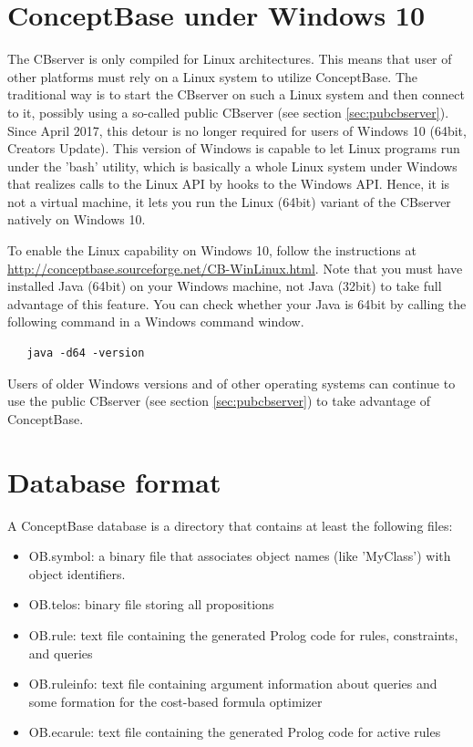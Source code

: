 \section{ConceptBase under Windows 10}
\label{sec:win10}
The CBserver is only compiled for Linux architectures. This means that user of
other platforms must rely on a Linux system to utilize ConceptBase. The traditional
way is to start the CBserver on such a Linux system and then connect to it, possibly
using a so-called public CBserver (see section \ref{sec:pubcbserver}).
Since April 2017, this detour is no longer required for users of Windows 10 (64bit,
Creators Update). This version of Windows is capable to let Linux programs
run under the 'bash' utility, which is basically a whole Linux system under Windows
that realizes calls to the Linux API by hooks to the Windows API. Hence, it is not
a virtual machine, it lets you run the Linux (64bit) variant of the CBserver
natively on Windows 10.

To enable the Linux capability on Windows 10, follow the instructions at
\url{http://conceptbase.sourceforge.net/CB-WinLinux.html}. Note that you must have
installed Java (64bit) on your Windows machine, not Java (32bit) to take full advantage
of this feature. You can check whether your Java is 64bit by calling the following command
in a Windows command window.

\begin{verbatim}
   java -d64 -version
\end{verbatim}


Users of older Windows versions and of other operating systems can continue to use the
public CBserver (see section \ref{sec:pubcbserver}) to take advantage of ConceptBase.



\section{Database format}

A ConceptBase database is a directory that contains at least the following files:

\begin{itemize}
\item OB.symbol: a binary file that associates object names (like 'MyClass') with
object identifiers. 
\item OB.telos: binary file storing all propositions
\item OB.rule: text file containing the generated Prolog code for rules, constraints,
and queries
\item OB.ruleinfo: text file containing argument information about queries and some
formation for the cost-based formula optimizer
\item OB.ecarule: text file containing the generated Prolog code for active rules
\end{itemize}

